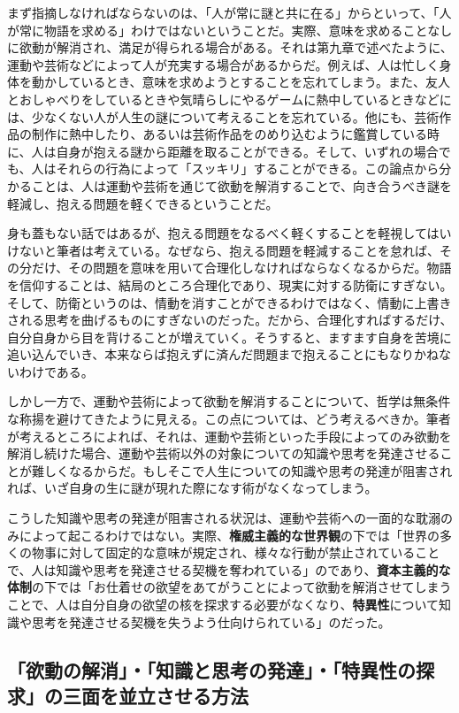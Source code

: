 まず指摘しなければならないのは、「人が常に謎と共に在る」からといって、「人が常に物語を求める」わけではないということだ。実際、意味を求めることなしに欲動が解消され、満足が得られる場合がある。それは第九章で述べたように、運動や芸術などによって人が充実する場合があるからだ。例えば、人は忙しく身体を動かしているとき、意味を求めようとすることを忘れてしまう。また、友人とおしゃべりをしているときや気晴らしにやるゲームに熱中しているときなどには、少なくない人が人生の謎について考えることを忘れている。他にも、芸術作品の制作に熱中したり、あるいは芸術作品をのめり込むように鑑賞している時に、人は自身が抱える謎から距離を取ることができる。そして、いずれの場合でも、人はそれらの行為によって「スッキリ」することができる。この論点から分かることは、人は運動や芸術を通じて欲動を解消することで、向き合うべき謎を軽減し、抱える問題を軽くできるということだ。

身も蓋もない話ではあるが、抱える問題をなるべく軽くすることを軽視してはいけないと筆者は考えている。なぜなら、抱える問題を軽減することを怠れば、その分だけ、その問題を意味を用いて合理化しなければならなくなるからだ。物語を信仰することは、結局のところ合理化であり、現実に対する防衛にすぎない。そして、防衛というのは、情動を消すことができるわけではなく、情動に上書きされる思考を曲げるものにすぎないのだった。だから、合理化すればするだけ、自分自身から目を背けることが増えていく。そうすると、ますます自身を苦境に追い込んでいき、本来ならば抱えずに済んだ問題まで抱えることにもなりかねないわけである。

しかし一方で、運動や芸術によって欲動を解消することについて、哲学は無条件な称揚を避けてきたように見える。この点については、どう考えるべきか。筆者が考えるところによれば、それは、運動や芸術といった手段によってのみ欲動を解消し続けた場合、運動や芸術以外の対象についての知識や思考を発達させることが難しくなるからだ。もしそこで人生についての知識や思考の発達が阻害されれば、いざ自身の生に謎が現れた際になす術がなくなってしまう。

こうした知識や思考の発達が阻害される状況は、運動や芸術への一面的な耽溺のみによって起こるわけではない。実際、\textbf{権威主義的な世界観}の下では「世界の多くの物事に対して固定的な意味が規定され、様々な行動が禁止されていることで、人は知識や思考を発達させる契機を奪われている」のであり、\textbf{資本主義的な体制}の下では「お仕着せの欲望をあてがうことによって欲動を解消させてしまうことで、人は自分自身の欲望の核を探求する必要がなくなり、\textbf{特異性}について知識や思考を発達させる契機を失うよう仕向けられている」のだった。

\subsection{「欲動の解消」・「知識と思考の発達」・「特異性の探求」の三面を並立させる方法}\label{ux6b32ux52d5ux306eux89e3ux6d88ux77e5ux8b58ux3068ux601dux8003ux306eux767aux9054ux7279ux7570ux6027ux306eux63a2ux6c42ux306eux4e09ux9762ux3092ux4e26ux7acbux3055ux305bux308bux65b9ux6cd5}

